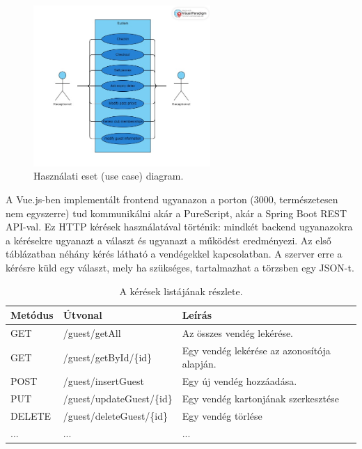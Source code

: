 \documentclass[12pt]{article}
\begin{document}
\begin{figure}[h!]
\centering
\includegraphics[width=0.6\textwidth]{usecase}
\caption{Használati eset (use case) diagram. }
\end{figure}


A Vue.js-ben implementált frontend ugyanazon a porton (3000, természetesen nem egyszerre) tud kommunikálni akár a PureScript,  akár a Spring Boot REST API-val. Ez HTTP kérések használatával történik: mindkét backend ugyanazokra a kérésekre ugyanazt a választ és ugyanazt a működést eredményezi.  Az első táblázatban néhány kérés látható a vendégekkel kapcsolatban. A szerver erre a kérésre küld egy választ, mely ha szükséges, tartalmazhat a törzsben egy JSON-t.

\begin{table}[h!]
\centering
\begin{tabular}{ |p{1.7cm}|p{4.4cm}|p{6.3cm}| } 
\hline
 \textbf{Metódus} & \textbf{Útvonal} &\textbf{Leírás}\\
\hline
GET & /guest/getAll& Az összes vendég lekérése.\\
\hline
GET & /guest/getById/\{id\}& Egy vendég lekérése az azonosítója alapján.\\
\hline
POST & /guest/insertGuest&  Egy új vendég hozzáadása. \\
\hline
PUT & /guest/updateGuest/\{id\} & Egy vendég kartonjának szerkesztése \\
\hline
DELETE & /guest/deleteGuest/\{id\} & Egy vendég törlése  \\
\hline
... & ... &...  \\
\hline
\end{tabular}
\caption{A kérések listájának részlete.}
\end{table}
\end{document}
